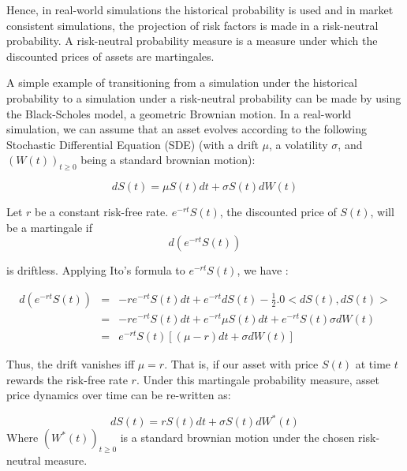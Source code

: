 \documentclass[a4paper]{article}\usepackage[]{graphicx}\usepackage[]{color}
\begin{document}
Hence, in real-world simulations the historical probability is used and in market consistent simulations, the projection of risk factors is made in a risk-neutral probability. A risk-neutral probability measure is a measure under which the discounted prices of assets are martingales.  

\medskip

A simple example of transitioning from a simulation under the historical probability to a simulation under a risk-neutral probability can be made by using the Black-Scholes model, a geometric Brownian motion. In a real-world simulation, we can assume that an asset evolves according to the following Stochastic Differential Equation (SDE) (with a drift $\mu$, a volatility $\sigma$, and $\left( W(t) \right)_{t \geq 0}$ being a standard brownian motion): 

\begin{equation}
dS(t) = \mu S(t) dt + \sigma S(t) dW(t)
\end{equation}

\medskip

Let $r$ be a constant risk-free rate. $e^{-rt}S(t)$, the discounted price of $S(t)$, will be a martingale if 
\begin{equation}
d(e^{-rt}S(t))
\end{equation}

is driftless. Applying Ito's formula to $e^{-rt}S(t)$, we have : 

\begin{eqnarray}
d(e^{-rt}S(t)) &=& -r e^{-rt} S(t) dt + e^{-rt} dS(t) - \frac{1}{2}.0 <dS(t), dS(t)>\\
               &=& -r e^{-rt} S(t) dt + e^{-rt} \mu S(t) dt + e^{-rt} S(t) \sigma dW(t) \\
               &=&  e^{-rt} S(t) \left[  (\mu - r) dt + \sigma dW(t) \right]
\end{eqnarray}

Thus, the drift vanishes iff $\mu = r$. That is, if our asset with price $S(t)$ at time $t$ rewards the risk-free rate $r$. Under this martingale probability measure, asset price dynamics over time can be re-written as:

\begin{equation}
dS(t) = r S(t) dt + \sigma S(t) dW^*(t)
\end{equation}
Where $\left(W^*(t)\right)_{t \geq 0}$ is a standard brownian motion under the chosen risk-neutral measure. 

\medskip
\end{document}
